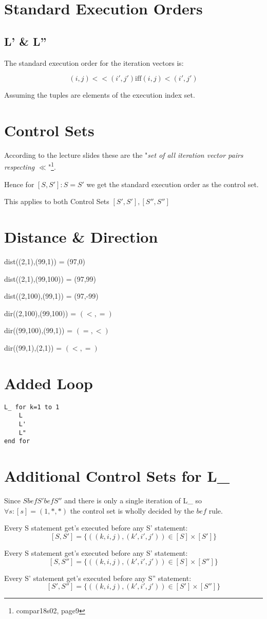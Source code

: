 \documentclass[]{article}
\begin{document}
\section{Standard Execution Orders}

\subsection{L' \& L''}
The standard execution order for the iteration vectors is:

$$ (i,j) << (i',j') \text{iff} (i,j) < (i',j') $$

Assuming the tuples are elements of the execution index set.

\section{Control Sets}

According to the lecture slides these are the "\textit{set of all iteration vector pairs respecting $\ll$}"\footnote{compar18s02, page9}.	

Hence for $[S,S']: S = S'$ we get the standard execution order as the control set.

This applies to both Control Sets $[S',S'], [S'',S'']$

\section{Distance \& Direction}

dist((2,1),(99,1)) = (97,0)

dist((2,1),(99,100)) = (97,99)

dist((2,100),(99,1)) = (97,-99)

dir((2,100),(99,100)) = $(<,=)$

dir((99,100),(99,1)) = $(=,<)$

dir((99,1),(2,1)) = $(<, =)$

\section{Added Loop}

\begin{lstlisting}
L_ for k=1 to 1
    L 
    L' 
    L"
end for
\end{lstlisting}

\section{Additional Control Sets for L\_}

Since $S \textit{bef} S' \textit{bef} S''$ and there is only a single iteration
of L\_ so $\forall s: [s] = (1,*,*)$ the
control set is wholly decided by the $bef$ rule.

Every S statement get's executed before any S' statement:
$$[S,S'] = \{ ((k,i,j),(k',i',j')) \in [S]\times[S'] \} $$

Every S statement get's executed before any S' statement:
$$[S,S''] = \{ ((k,i,j),(k',i',j')) \in [S]\times[S''] \} $$

Every S' statement get's executed before any S'' statement:
$$[S',S''] = \{ ((k,i,j),(k',i',j')) \in [S']\times[S''] \} $$
\end{document}
